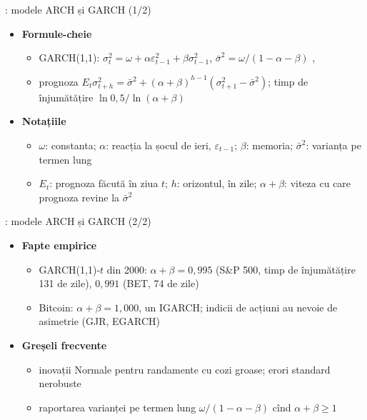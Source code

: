 \begin{frame}{: modele ARCH și GARCH (1/2)}
\itemsize{\small}
\begin{itemize}
    \item \textbf{Formule-cheie}
    \begin{itemize}
        \item GARCH(1,1): $\sigma_t^2 = \omega + \alpha\varepsilon_{t-1}^2 + \beta\sigma_{t-1}^2$, $\bar\sigma^2 = \omega/(1 - \alpha - \beta)$ , 
        \item prognoza $E_t\sigma_{t+h}^2 = \bar\sigma^2 + (\alpha + \beta)^{h-1}(\sigma_{t+1}^2 - \bar\sigma^2)$; timp de înjumătățire $\ln 0{,}5/\ln(\alpha + \beta)$
    \end{itemize}
    \item \textbf{Notațiile}
    \begin{itemize}
        \item $\omega$: constanta; $\alpha$: reacția la șocul de ieri, $\varepsilon_{t-1}$; $\beta$: memoria; $\bar\sigma^2$: varianța pe termen lung
        \item $E_t$: prognoza făcută în ziua $t$; $h$: orizontul, în zile; $\alpha + \beta$: viteza cu care prognoza revine la $\bar\sigma^2$
    \end{itemize}
\end{itemize}
\end{frame}

\begin{frame}{: modele ARCH și GARCH (2/2)}
\itemsize{\small}
\begin{itemize}
    \item \textbf{Fapte empirice}
    \begin{itemize}
        \item GARCH(1,1)-$t$ din 2000: $\alpha + \beta = 0{,}995$ (S\&P 500, timp de înjumătățire 131 de zile), $0{,}991$ (BET, 74 de zile)
        \item Bitcoin: $\alpha + \beta = 1{,}000$, un IGARCH; indicii de acțiuni au nevoie de asimetrie (GJR, EGARCH)
    \end{itemize}
    \item \textbf{Greșeli frecvente}
    \begin{itemize}
        \item inovații Normale pentru randamente cu cozi groase; erori standard nerobuste
        \item raportarea varianței pe termen lung $\omega/(1 - \alpha - \beta)$ cînd $\alpha + \beta \ge 1$
    \end{itemize}
\end{itemize}
\end{frame}

